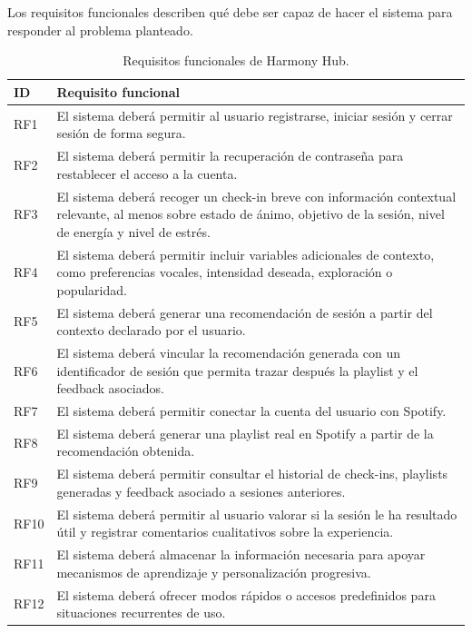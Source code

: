 Los requisitos funcionales describen qué debe ser capaz de hacer el sistema para responder al problema planteado.

\begin{table}[H]
\centering
\small
\renewcommand{\arraystretch}{1.1}
\begin{tabularx}{\textwidth}{|P{1.5cm}|Y|}
\hline
\textbf{ID} & \textbf{Requisito funcional} \\
\hline
RF1 & El sistema deberá permitir al usuario registrarse, iniciar sesión y cerrar sesión de forma segura. \\
\hline
RF2 & El sistema deberá permitir la recuperación de contraseña para restablecer el acceso a la cuenta. \\
\hline
RF3 & El sistema deberá recoger un check-in breve con información contextual relevante, al menos sobre estado de ánimo, objetivo de la sesión, nivel de energía y nivel de estrés. \\
\hline
RF4 & El sistema deberá permitir incluir variables adicionales de contexto, como preferencias vocales, intensidad deseada, exploración o popularidad. \\
\hline
RF5 & El sistema deberá generar una recomendación de sesión a partir del contexto declarado por el usuario. \\
\hline
RF6 & El sistema deberá vincular la recomendación generada con un identificador de sesión que permita trazar después la playlist y el feedback asociados. \\
\hline
RF7 & El sistema deberá permitir conectar la cuenta del usuario con Spotify. \\
\hline
RF8 & El sistema deberá generar una playlist real en Spotify a partir de la recomendación obtenida. \\
\hline
RF9 & El sistema deberá permitir consultar el historial de check-ins, playlists generadas y feedback asociado a sesiones anteriores. \\
\hline
RF10 & El sistema deberá permitir al usuario valorar si la sesión le ha resultado útil y registrar comentarios cualitativos sobre la experiencia. \\
\hline
RF11 & El sistema deberá almacenar la información necesaria para apoyar mecanismos de aprendizaje y personalización progresiva. \\
\hline
RF12 & El sistema deberá ofrecer modos rápidos o accesos predefinidos para situaciones recurrentes de uso. \\
\hline
\end{tabularx}
\caption{Requisitos funcionales de Harmony Hub.}
\label{tab:requisitos_funcionales}
\end{table}

